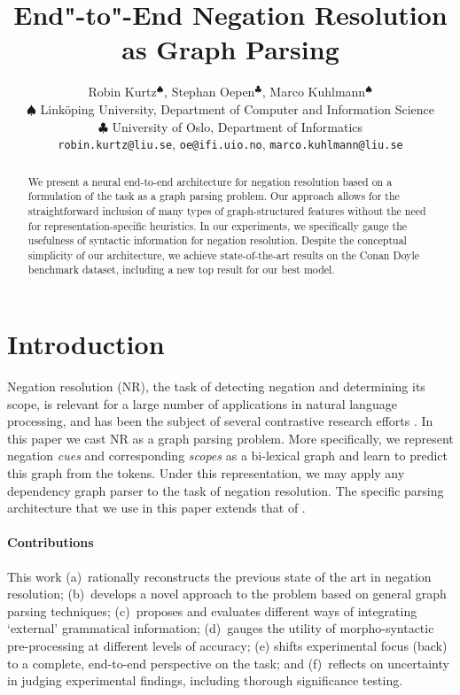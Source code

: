 \documentclass[11pt,a4paper]{article}
\title{End"-to"-End Negation Resolution as Graph Parsing}
\author{
    Robin Kurtz$^\spadesuit$, Stephan Oepen$^\clubsuit$, Marco Kuhlmann$^\spadesuit$ \\ %
    {\normalsize $\spadesuit$ Linköping University, Department of Computer and Information Science}\\ %
    {\normalsize $\clubsuit$ University of Oslo, Department of Informatics}\\ %
 \texttt{robin.kurtz@liu.se}, \texttt{oe@ifi.uio.no}, \texttt{marco.kuhlmann@liu.se}
 }   %
\date{}
\theoremstyle{plain}
\begin{document}
\maketitle
\begin{abstract}
  We present a neural end-to-end architecture for negation resolution
  based on a formulation of the task as a graph parsing problem.
  Our approach allows for the straightforward inclusion of many types
  of graph-structured features without the need for
  representation-specific heuristics.
  In our experiments, we specifically gauge the usefulness of
  syntactic information for negation resolution.
  Despite the conceptual simplicity of our architecture, we achieve
  state-of-the-art results on the Conan Doyle benchmark dataset,
  including a new top result for our best model.
\end{abstract}

\section{Introduction}
\label{sec:introduction}

Negation resolution (NR), the task of detecting negation and determining its scope,
is relevant for a large number of applications in
natural language processing, and has been the subject of several
contrastive research efforts
\citep{Mor:Bla:12,Oep:Ovr:Bjo:17,Far:Oep:Ovr:18}.
In this paper we cast NR as a graph parsing problem.
More specifically, we represent negation \emph{cues} and corresponding \emph{scopes} as a
bi-lexical graph and learn to predict this graph from the tokens.
Under this representation, we may apply any dependency graph
parser to the task of negation resolution.
The specific parsing architecture that we use in this paper extends that of \citet{dozat2018simpler}.


\paragraph{Contributions}
This work
(a)~rationally reconstructs the previous state of the art in negation
resolution;
(b)~develops a novel approach to the problem based on general graph
parsing techniques;
(c)~proposes and evaluates different ways of integrating `external'
grammatical information;
(d)~gauges the utility of morpho-syntactic pre-processing at different
levels of accuracy;
(e) shifts experimental focus (back) to a complete, end-to-end
perspective on the task; and 
(f)~reflects on uncertainty in judging experimental findings,
including thorough significance testing.
\end{document}
